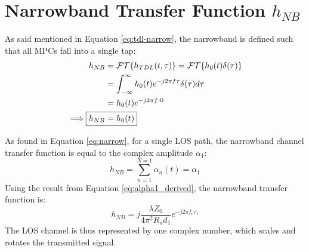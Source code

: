 \section{Narrowband Transfer Function $h_{NB}$}
As said mentioned in Equation \ref{eq:tdl-narrow}, the narrowband is defined such that all MPCs fall into a single tap:
\begin{align}
	h_{NB} &= \mathcal{FT}\{ h_{TDL}(t, \tau)\} = \mathcal{FT}\{ h_{0}(t)\delta(\tau)\} \\
	&= \int_{-\infty}^{\infty} h_0(t) e^{-j2\pi f \tau} \delta(\tau) d\tau \\
	&=h_0(t)e^{-j2\pi f \cdot \hspace{0.05em} 0} \\
	\implies \Aboxed{h_{NB} &= h_0(t)}
\end{align}

As found in Equation \ref{eq:narrow}, for a single LOS path, the narrowband channel transfer function is equal to the complex amplitude $\alpha_1$:
\begin{equation}
	h_{NB} = \sum_{n=1}^{N=1} \alpha_n(t) = \alpha_1
\end{equation}
Using the result from Equation \ref{eq:alpha1_derived}, the narrowband transfer function is:
\begin{equation}
	\boxed{h_{NB} = j \frac{\lambda Z_0}{4\pi^2 R_a d_1} e^{-j2\pi f_c \tau_1}}
	\label{eq:los_narrowband_tf_detailed}
\end{equation}
The LOS channel is thus represented by one complex number, which scales and rotates the transmitted signal.

